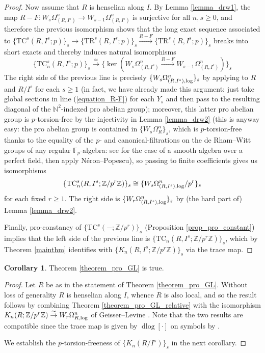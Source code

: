 \documentclass{amsart}
\theoremstyle{definition}
\newtheorem{corollary}[definition]{Corollary}
\newcommand{\bb}{\mathbb}
\newcommand{\isoto}{\stackrel{\simeq}{\to}}
\DeclareMathOperator{\dlog}{dlog}
\newcommand{\sub}[1]{{\mbox{\rm \scriptsize #1}}}
\newcommand{\xto}{\xrightarrow}
\newcommand{\TR}{\mathrm{TR}}
\newcommand{\TC}{\mathrm{TC}}
\begin{document}
\begin{proof}
Now assume that $R$ is henselian along $I$. By Lemma \ref{lemma_drw1}, the map
$R-F:W_{s}\Omega^n_{(R,I^s)}\to W_{s-1}\Omega^n_{(R,I^s)}$ is surjective for all
$n,s\ge0$, and therefore the previous isomorphism shows that the long exact
sequence associated to $\{\TC^s(R,I^s;p)\}_s\to
\{\TR^s(R,I^s;p)\}_s\xto{R-F}\{\TR^s(R,I^s;p)\}_s$ breaks into short exacts and
thereby induces natural isomorphisms \[\{\TC^s_n(R,I^s;p)\}_s\isoto
\{\ker(W_{s}\Omega^n_{(R,I^s)}\xto{R-F} W_{s-1}\Omega^n_{(R,I^s)})\}_s\] The
right side of the previous line is precisely
$\{W_s\Omega^n_{(R,I^s),\sub{log}}\}_s$ by applying \cite[Cor. 
4.1(iii)]{Morrow-HW} to $R$ and $R/I^s$ for each $s\ge1$ (in fact, we have
already made this argument: just take global sections in line
(\ref{equation_R-F}) for each $Y_s$ and then pass to the resulting diagonal of
the $\bb N^2$-indexed pro abelian group); moreover, this latter pro abelian
group is $p$-torsion-free by the injectivity in Lemma \ref{lemma_drw2} (this is
anyway easy: the pro abelian group is contained in $\{W_s\Omega^n_R\}_s$, which
is $p$-torsion-free thanks to the equality of the $p$- and canonical-filtrations
on the de Rham--Witt groups of any regular $\bb F_p$-algebra: see
\cite[Prop.~I.3.2 \& I.3.4]{illusie-derham-witt} for the case of a smooth algebra over a perfect field, then apply N\'eron--Popescu), so passing to finite coefficients gives us isomorphisms \[\{\TC^s_n(R,I^s;\bb Z/p^r\bb Z)\}_s\cong\{W_s\Omega^n_{(R,I^s),\sub{log}}/p^r\}_s\] for each fixed $r\ge1$. The right side is $\{W_r\Omega^n_{(R,I^s),\sub{log}}\}_s$ by (the hard part of) Lemma \ref{lemma_drw2}.

Finally, pro-constancy of $\{\TC^s(-;\bb Z/p^r)\}_s$ (Proposition \ref{prop_pro_constant}) implies that the left side of the previous line is $\{\TC_n(R,I^s;\bb Z/p^r\bb Z)\}_s$, which by Theorem \ref{mainthm} identifies with $\{K_n(R,I^s;\bb Z/p^r\bb Z)\}_s$ via the trace map.
\end{proof}

\begin{corollary}
Theorem \ref{theorem_pro_GL} is true.
\end{corollary}
\begin{proof}
Let $R$ be as in the statement of Theorem \ref{theorem_pro_GL}. Without loss of generality $R$ is henselian along $I$, whence $R$ is also local, and so the result follows by combining Theorem \ref{theorem_pro_GL_relative} with the isomorphism $K_n(R; \bb Z/p^r\bb Z)\isoto W_r\Omega^n_{R,\sub{log}}$ of Geisser--Levine \cite{GL}. Note that the two results are compatible since the trace map is given by $\dlog[\cdot]$ on symbols by \cite[Lem.~4.2.3 \& Cor.~6.4.1]{GH}.

We establish the $p$-torsion-freeness of $\{K_n(R/I^s)\}_s$ in the next corollary.
\end{proof}
\end{document}
